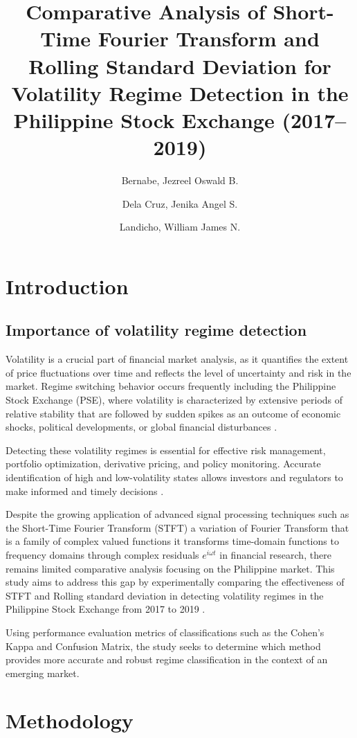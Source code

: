 \documentclass[12pt,letterpaper]{article}
\title{Comparative Analysis of Short-Time Fourier Transform and Rolling Standard Deviation for Volatility Regime Detection in the Philippine Stock Exchange (2017–2019)}
\author{
	Bernabe, Jezreel Oswald B. \and
	Dela Cruz, Jenika Angel S. \and
	Landicho, William James N.}
\begin{document}
	\maketitle
	\section{Introduction}
		\subsection{Importance of volatility regime detection }
			Volatility is a crucial part of financial market analysis, as it quantifies the extent of price fluctuations over time and reflects the level of uncertainty and risk in the market. Regime switching behavior occurs frequently including the Philippine Stock Exchange (PSE), where volatility is characterized by extensive periods of relative stability that are followed by sudden spikes as an outcome of economic shocks, political developments, or global financial disturbances \parencite{tiltfolio_volatility_clustering_2026}. 
			
			Detecting these volatility regimes is essential for effective risk management, portfolio optimization, derivative pricing, and policy monitoring. Accurate identification of high and low-volatility states allows investors and regulators to make informed and timely decisions \parencite{tiltfolio_volatility_clustering_2026}.
			
			Despite the growing application of advanced signal processing techniques such as the Short-Time Fourier Transform (STFT) a variation of Fourier Transform that is a family of complex valued functions it transforms time-domain functions to frequency domains through complex residuals $e^{i \omega t}$
			in financial research, there remains limited comparative analysis focusing on the Philippine market. This study aims to address this gap by experimentally comparing the effectiveness of STFT and Rolling standard deviation in detecting volatility regimes in the Philippine Stock Exchange from 2017 to 2019 \parencite{iop_012041_2013}.
			 
			Using performance evaluation metrics of classifications such as the Cohen's Kappa and Confusion Matrix, the study seeks to determine which method provides more accurate and robust regime classification in the context of an emerging market. 
	\section{Methodology}
\end{document}
